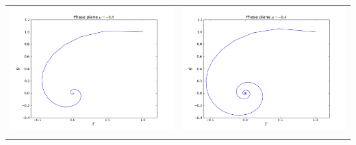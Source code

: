 \documentclass[12pt,a4paper,titlepage]{article}
\begin{document}
\begin{table}[ht]
\centering
\begin{tabular}{cc}
\includegraphics[scale=0.3]{phase_hopf08m}&\includegraphics[scale=0.3]{phase_hopf04m}\\
\newline

\end{tabular}
\end{table}
\end{document}
